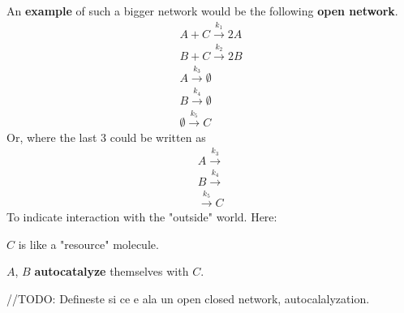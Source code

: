 An \textbf{example} of such a bigger network would be the following \textbf{open network}.
\begin{align*}
	A + C \xrightarrow{k_{1}} 2A \\
	B + C \xrightarrow{k_{2}} 2B  \\
	A \xrightarrow{k_{3}} \emptyset \\
	B \xrightarrow{k_{4}} \emptyset \\
	\emptyset \xrightarrow{k_{5}} C
\end{align*}
Or, where the last $3$ could be written as
\begin{align*}
	A \xrightarrow{k_{3}} \\
	B \xrightarrow{k_{4}} \\
	\xrightarrow{k_{5}} C	
\end{align*}
To indicate interaction with the "outside" world.
Here: 	

$C$ is like a "resource" molecule.

$A$, $B$ \textbf{autocatalyze} themselves with $C$.

\hfill\break
//TODO: Defineste si ce e ala un open closed network, autocalalyzation.
\hfill\break

